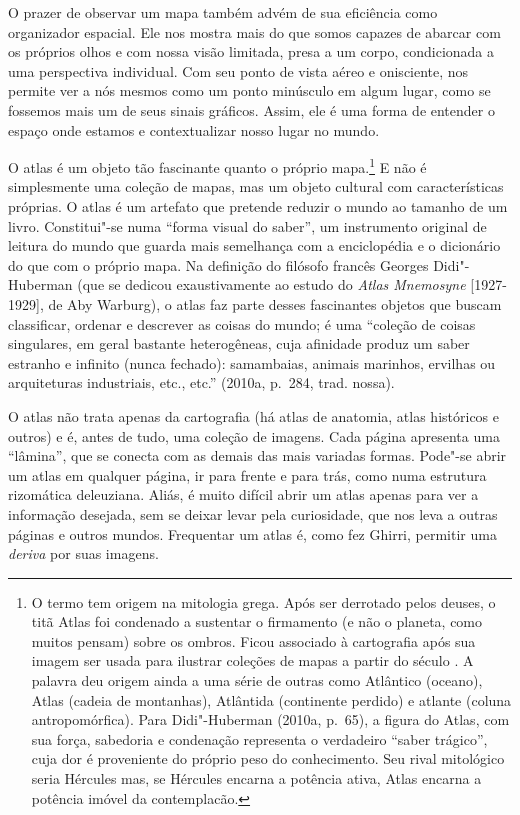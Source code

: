 O prazer de observar um mapa também advém de sua eficiência como
organizador espacial. Ele nos mostra mais do que somos capazes de
abarcar com os próprios olhos e com nossa visão limitada, presa a um
corpo, condicionada a uma perspectiva individual. Com seu ponto de vista
aéreo e onisciente, nos permite ver a nós mesmos como um ponto minúsculo
em algum lugar, como se fossemos mais um de seus sinais gráficos. Assim,
ele é uma forma de entender o espaço onde estamos e contextualizar nosso
lugar no mundo.

O atlas é um objeto tão fascinante quanto o próprio mapa.\footnote{O
  termo tem origem na mitologia grega. Após ser derrotado pelos deuses,
  o titã Atlas foi condenado a sustentar o firmamento (e não o planeta,
  como muitos pensam) sobre os ombros. Ficou associado à cartografia
  após sua imagem ser usada para ilustrar coleções de mapas a partir do
  século . A palavra deu origem ainda a uma série de outras como
  Atlântico (oceano), Atlas (cadeia de montanhas), Atlântida (continente
  perdido) e atlante (coluna antropomórfica). Para Didi"-Huberman (2010a,
  p.~65), a figura do Atlas, com sua força, sabedoria e condenação
  representa o verdadeiro ``saber trágico'', cuja dor é proveniente do
  próprio peso do conhecimento. Seu rival mitológico seria Hércules mas,
  se Hércules encarna a potência ativa, Atlas encarna a potência imóvel
  da contemplacão.} E não é simplesmente uma coleção de mapas, mas um
objeto cultural com características próprias. O atlas é um artefato que
pretende reduzir o mundo ao tamanho de um livro. Constitui"-se numa
``forma visual do saber'', um instrumento original de leitura do mundo
que guarda mais semelhança com a enciclopédia e o dicionário do que com
o próprio mapa. Na definição do filósofo francês Georges Didi"-Huberman
(que se dedicou exaustivamente ao estudo do \emph{Atlas Mnemosyne}
{[}1927-1929{]}, de Aby Warburg), o atlas faz parte desses fascinantes
objetos que buscam classificar, ordenar e descrever as coisas do mundo;
é uma ``coleção de coisas singulares, em geral bastante heterogêneas,
cuja afinidade produz um saber estranho e infinito (nunca fechado):
samambaias, animais marinhos, ervilhas ou arquiteturas industriais,
etc., etc.'' (2010a, p.~284, trad. nossa).

O atlas não trata apenas da cartografia (há atlas de anatomia, atlas
históricos e outros) e é, antes de tudo, uma coleção de imagens. Cada
página apresenta uma ``lâmina'', que se conecta com as demais das mais
variadas formas. Pode"-se abrir um atlas em qualquer página, ir para
frente e para trás, como numa estrutura rizomática deleuziana. Aliás, é
muito difícil abrir um atlas apenas para ver a informação desejada, sem
se deixar levar pela curiosidade, que nos leva a outras páginas e outros
mundos. Frequentar um atlas é, como fez Ghirri, permitir uma
\emph{deriva} por suas imagens.

